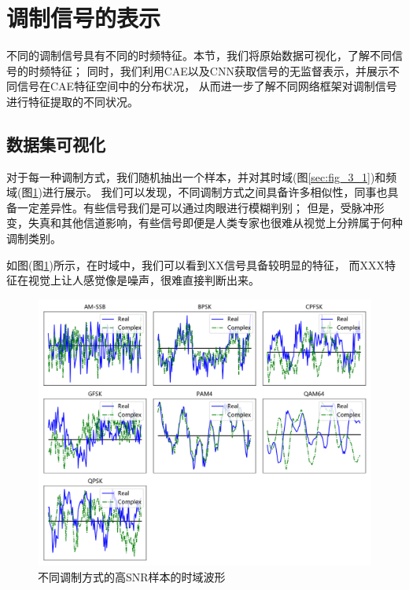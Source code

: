 \section{调制信号的表示}

不同的调制信号具有不同的时频特征。本节，我们将原始数据可视化，了解不同信号的时频特征；
同时，我们利用CAE以及CNN获取信号的无监督表示，并展示不同信号在CAE特征空间中的分布状况，
从而进一步了解不同网络框架对调制信号进行特征提取的不同状况。

\subsection{数据集可视化}

对于每一种调制方式，我们随机抽出一个样本，并对其时域(图\ref{sec:fig_3_1})和频域(图\ref{sec:fig_3_2})进行展示。
我们可以发现，不同调制方式之间具备许多相似性，同事也具备一定差异性。有些信号我们是可以通过肉眼进行模糊判别；
但是，受脉冲形变，失真和其他信道影响，有些信号即便是人类专家也很难从视觉上分辨属于何种调制类别。\par

如图(图\ref{sec:fig_3_2})所示，在时域中，我们可以看到XX信号具备较明显的特征，
而XXX特征在视觉上让人感觉像是噪声，很难直接判断出来。\par
\begin{figure}[!h]
	\centering
	\includegraphics[scale=0.3]{figures/chapter_3/fig_3_2}
	\caption{不同调制方式的高SNR样本的时域波形}\label{sec:fig_3_2}
\end{figure}


